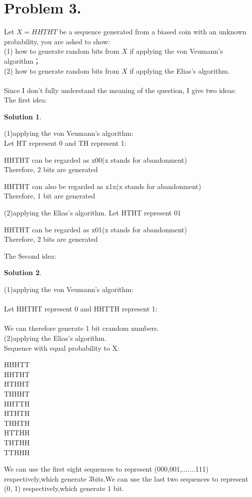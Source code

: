 \documentclass[UTF8,oneside]{article}
\newtheorem*{Solution}{Solution}
\begin{document}
\section*{Problem 3.}
Let $X=H H T H T$ be a sequence generated from a biased coin with an unknown probability, you are asked to show:\\
(1) how to generate random bits from $X$ if applying the von Veumann's algorithm；\\
(2) how to generate random bits from $X$ if applying the Elias's algorithm.\\
\\
Since I don't fully understand the meaning of the question, I give two ideas:\\
The first idea:
\begin{Solution}
\end{Solution}
(1)applying the von Veumann's algorithm:\\
\qquad\qquad Let HT represent 0 and TH represent 1:\\
\begin{center}
	HHTHT can be regarded as x00(x stands for abandonment)\\
	Therefore, 2 bits are generated
\end{center}

\begin{center}
	HHTHT can also be regarded as x1x(x stands for abandonment)\\
	Therefore, 1 bit are generated
\end{center}

(2)applying the Elias's algorithm.
Let HTHT represent 01 
\begin{center}
	HHTHT can be regarded as x01(x stands for abandonment)\\
	Therefore, 2 bits are generated
\end{center}
The Second idea:
\begin{Solution}
\end{Solution}
(1)applying the von Veumann's algorithm:\\
\\ 
Let HHTHT represent 0 and HHTTH represent 1:\\
\\
We can therefore generate 1 bit crandom numbers.\\

(2)applying the Elias's algorithm.\\
Sequence with equal probability to X:
\begin{center}
	HHHTT\\
	HHTHT\\
	HTHHT\\
	THHHT\\
	HHTTH\\
	HTHTH\\
	THHTH\\
	HTTHH\\
	THTHH\\
	TTHHH\\
\end{center}
We can use the first eight sequences to represent (000,001,.......111) respectively,which generate 3bits.We can use the last two sequences to represent (0, 1) respectively,which generate 1 bit.
\end{document}
